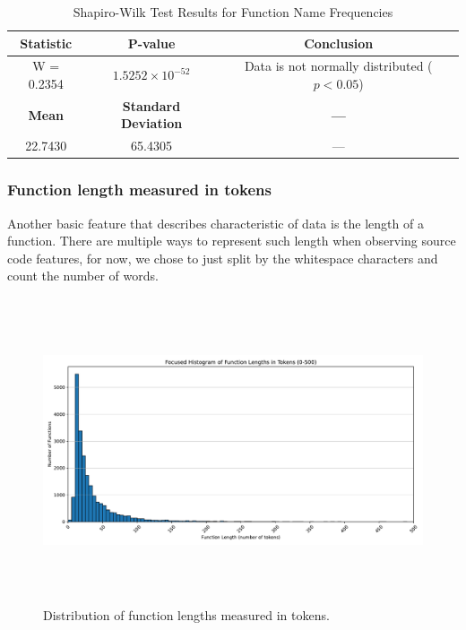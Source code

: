 \documentclass[10pt,english,a4paper]{report}
\begin{document}
\begin{table}[h!]
    \centering
    \caption{Shapiro-Wilk Test Results for Function Name Frequencies}
    \label{tab:shapiro_wilk_names}
    \begin{tabular}{|c|c|c|}
        \hline
        \textbf{Statistic} & \textbf{P-value} & \textbf{Conclusion} \\
        \hline
        W = 0.2354 & $1.5252 \times 10^{-52}$ & Data is not normally distributed ($p < 0.05$) \\
        \hline
        \textbf{Mean} & \textbf{Standard Deviation} & \textbf{---} \\
        \hline
        22.7430 & 65.4305 & --- \\
        \hline
    \end{tabular}
\end{table}


\subsubsection{Function length measured in tokens}

Another basic feature that describes characteristic of data is the length of a function. There are multiple ways to represent such length when observing source code features, for now, we chose 
to just split by the whitespace characters and count the number of words.

\begin{figure}[H]
    \centering
    \includegraphics[width=16cm, height=9cm]{figures/FOCUSED_functionsASTs_merged_length_histogram.pdf} 
    \caption{Distribution of function lengths measured in tokens.}
    \label{fig:func_lengths_distr_merged}
\end{figure}
\end{document}
